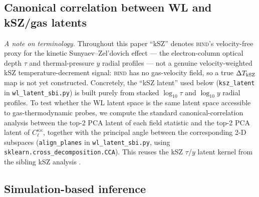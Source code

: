 \documentclass[11pt]{article}
\newcommand{\bind}{\textsc{bind}}
\begin{document}
\subsection{Canonical correlation between WL and kSZ/gas latents}\label{sec:methods-cca}

\emph{A note on terminology.} Throughout this paper ``kSZ'' denotes
\bind{}'s velocity-free proxy for the kinetic Sunyaev--Zel'dovich effect —
the electron-column optical depth $\tau$ and thermal-pressure $y$ radial
profiles — not a genuine velocity-weighted kSZ temperature-decrement
signal: \bind{} has no gas-velocity field, so a true $\Delta T_{\rm kSZ}$
map is not yet constructed. Concretely, the ``kSZ latent'' used below
(\texttt{ksz\_latent} in \texttt{wl\_latent\_sbi.py}) is built purely from
stacked $\log_{10}\tau$ and $\log_{10}y$ radial profiles. %
To test whether the WL latent space is the same latent space accessible
to gas-thermodynamic probes, we compute the standard canonical-correlation
analysis \citep[CCA;][]{Hotelling1936CCA} between the top-2 PCA latent of
each field statistic and the top-2 PCA latent of $C_\ell^{\kappa\kappa}$,
together with the principal angle between the corresponding 2-D subspaces
(\texttt{align\_planes} in \texttt{wl\_latent\_sbi.py}, using
\texttt{sklearn.cross\_decomposition.CCA}). This reuses the kSZ
$\tau$/$y$ latent kernel from the sibling kSZ analysis
\citep[Paper~IV, in prep]{bindIV}. %

\subsection{Simulation-based inference}\label{sec:methods-sbi}
\end{document}
